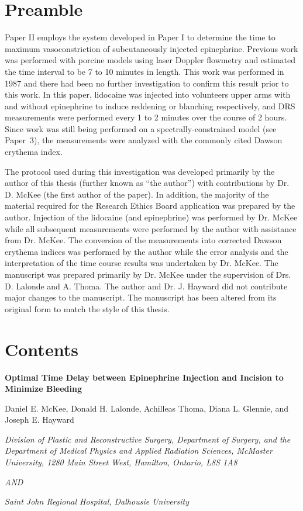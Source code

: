 \label{chap:p2-mckee}
\section*{Preamble}
Paper II employs the system developed in Paper I to determine the time to maximum vasoconstriction of subcutaneously injected epinephrine. Previous work was performed with porcine models using laser Doppler flowmetry and estimated the time interval to be 7 to 10 minutes in length.\cite{Larrabee1987} This work was performed in 1987 and there had been no further investigation to confirm this result prior to this work. In this paper, lidocaine was injected into volunteers upper arms with and without epinephrine to induce reddening or blanching respectively, and DRS measurements were performed every 1 to 2 minutes over the course of 2 hours. Since work was still being performed on a spectrally-constrained model (see Paper~3), the measurements were analyzed with the commonly cited Dawson erythema index.\cite{Dawson1980}

The protocol used during this investigation was developed primarily by the author of this thesis (further known as ``the author'') with contributions by Dr. D. McKee (the first author of the paper). In addition, the majority of the material required for the Research Ethics Board application was prepared by the author. Injection of the lidocaine (and epinephrine) was performed by Dr. McKee while all subsequent measurements were performed by the author with assistance from Dr. McKee. The conversion of the measurements into corrected Dawson erythema indices was performed by the author while the error analysis and the interpretation of the time course results was undertaken by Dr. McKee. The manuscript was prepared primarily by Dr. McKee under the supervision of Drs. D. Lalonde and A. Thoma. The author and Dr. J. Hayward did not contribute major changes to the manuscript. The manuscript has been altered from its original form to match the style of this thesis.

\section*{Contents}

\begin{center}

\textbf{Optimal Time Delay between Epinephrine Injection and Incision to Minimize Bleeding}

Daniel E. McKee, Donald H. Lalonde, Achilleas Thoma, Diana L. Glennie, and Joseph E. Hayward

\textit{Division of Plastic and Reconstructive Surgery, Department of Surgery, and the Department of Medical Physics and Applied Radiation Sciences, McMaster University, 1280 Main Street West, Hamilton, Ontario, L8S 1A8}

\textit{AND}

\textit{Saint John Regional Hospital, Dalhousie University}

\end{center}

